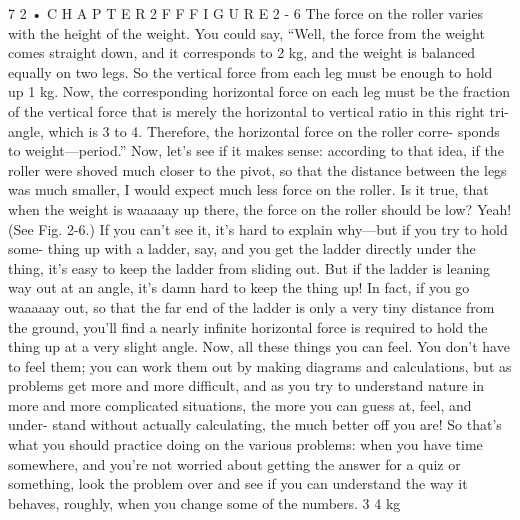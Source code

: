 \documentclass[10pt,oneside]{article}
\begin{document}
7 2 • C H A P T E R  2 F F F I G U R E  2 - 6 The force on the roller varies with the height of the weight. You could say, “Well, the force from the weight comes straight down, and it corresponds to 2 kg, and the weight is balanced equally on two legs. So the vertical force from each leg must be enough to hold up 1 kg. Now, the corresponding horizontal force on each leg must be the fraction of the vertical force that is merely the horizontal to vertical ratio in this right tri- angle, which is 3 to 4. Therefore, the horizontal force on the roller corre- sponds to weight---period.” Now, let’s see if it makes sense: according to that idea, if the roller were shoved much closer to the pivot, so that the distance between the legs was much smaller, I would expect much less force on the roller. Is it true, that when the weight is waaaaay up there, the force on the roller should be low? Yeah! (See Fig. 2-6.) If you can’t see it, it’s hard to explain why---but if you try to hold some- thing up with a ladder, say, and you get the ladder directly under the thing, it’s easy to keep the ladder from sliding out. But if the ladder is leaning way out at an angle, it’s damn hard to keep the thing up! In fact, if you go waaaaay out, so that the far end of the ladder is only a very tiny distance from the ground, you’ll find a nearly infinite horizontal force is required to hold the thing up at a very slight angle. Now, all these things you can feel. You don’t have to feel them; you can work them out by making diagrams and calculations, but as problems get more and more difficult, and as you try to understand nature in more and more complicated situations, the more you can guess at, feel, and under- stand without actually calculating, the much better off you are! So that’s what you should practice doing on the various problems: when you have time somewhere, and you’re not worried about getting the answer for a quiz or something, look the problem over and see if you can understand the way it behaves, roughly, when you change some of the numbers. 3 4 kg\par
\end{document}
